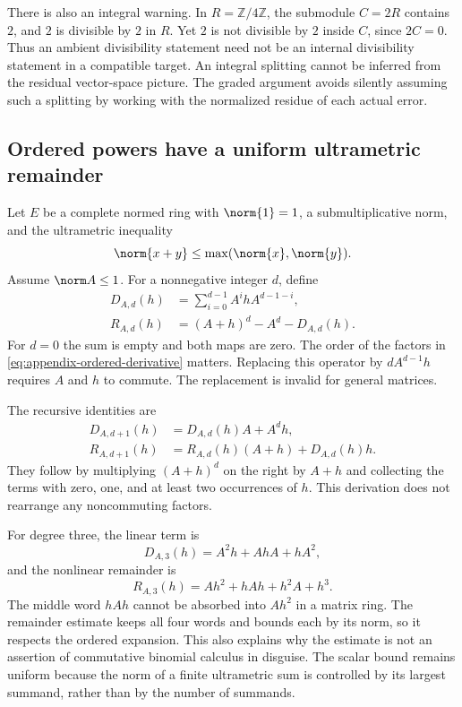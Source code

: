 There is also an integral warning. In $R=\mathbb Z/4\mathbb Z$, the
submodule $C=2R$ contains $2$, and $2$ is divisible by $2$ in $R$. Yet
$2$ is not divisible by $2$ inside $C$, since $2C=0$. Thus an ambient
divisibility statement need not be an internal divisibility statement in a
compatible target. An integral splitting cannot be inferred from the
residual vector-space picture. The graded argument avoids silently
assuming such a splitting by working with the normalized residue of each
actual error.

\subsection{Ordered powers have a uniform ultrametric remainder}

Let $E$ be a complete normed ring with $\norm{1}=1$, a submultiplicative
norm, and the ultrametric inequality
\[
 \norm{x+y}\le\max(\norm{x},\norm{y}).
\]
Assume $\norm A\le1$. For a nonnegative integer $d$, define
\begin{align}
 D_{A,d}(h)&=\sum_{i=0}^{d-1}A^ihA^{d-1-i},
 \label{eq:appendix-ordered-derivative}\\
 R_{A,d}(h)&=(A+h)^d-A^d-D_{A,d}(h).
 \label{eq:appendix-ordered-remainder}
\end{align}
For $d=0$ the sum is empty and both maps are zero. The order of the
factors in \eqref{eq:appendix-ordered-derivative} matters. Replacing this
operator by $dA^{d-1}h$ requires $A$ and $h$ to commute. The replacement
is invalid for general matrices.

The recursive identities are
\begin{align*}
 D_{A,d+1}(h)&=D_{A,d}(h)A+A^dh,\\
 R_{A,d+1}(h)&=R_{A,d}(h)(A+h)+D_{A,d}(h)h.
\end{align*}
They follow by multiplying $(A+h)^d$ on the right by $A+h$ and collecting
the terms with zero, one, and at least two occurrences of $h$. This
derivation does not rearrange any noncommuting factors.

For degree three, the linear term is
\[
 D_{A,3}(h)=A^2h+AhA+hA^2,
\]
and the nonlinear remainder is
\[
 R_{A,3}(h)=Ah^2+hAh+h^2A+h^3.
\]
The middle word $hAh$ cannot be absorbed into $Ah^2$ in a matrix ring.
The remainder estimate keeps all four words and bounds each by its
norm, so it respects the ordered expansion. This also explains why the
estimate is not an assertion of commutative binomial calculus in
disguise. The scalar bound remains uniform because the norm of a finite
ultrametric sum is controlled by its largest summand, rather than by the
number of summands.

